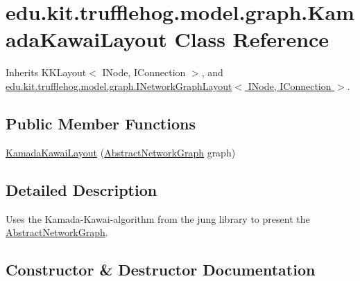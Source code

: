 \hypertarget{classedu_1_1kit_1_1trufflehog_1_1model_1_1graph_1_1_kamada_kawai_layout}{}\section{edu.\+kit.\+trufflehog.\+model.\+graph.\+Kamada\+Kawai\+Layout Class Reference}
\label{classedu_1_1kit_1_1trufflehog_1_1model_1_1graph_1_1_kamada_kawai_layout}


Inherits K\+K\+Layout$<$ I\+Node, I\+Connection $>$, and \hyperlink{interfaceedu_1_1kit_1_1trufflehog_1_1model_1_1graph_1_1_i_network_graph_layout}{edu.\+kit.\+trufflehog.\+model.\+graph.\+I\+Network\+Graph\+Layout$<$ I\+Node, I\+Connection $>$}.

\subsection*{Public Member Functions}
\begin{DoxyCompactItemize}
\item 
\hyperlink{classedu_1_1kit_1_1trufflehog_1_1model_1_1graph_1_1_kamada_kawai_layout_a2acb1f5d7d72b4cbc32257b7bb207762}{Kamada\+Kawai\+Layout} (\hyperlink{classedu_1_1kit_1_1trufflehog_1_1model_1_1graph_1_1_abstract_network_graph}{Abstract\+Network\+Graph} graph)
\end{DoxyCompactItemize}


\subsection{Detailed Description}
Uses the Kamada-\/\+Kawai-\/algorithm from the jung library to present the \hyperlink{classedu_1_1kit_1_1trufflehog_1_1model_1_1graph_1_1_abstract_network_graph}{Abstract\+Network\+Graph}. 

\subsection{Constructor \& Destructor Documentation}
\hypertarget{classedu_1_1kit_1_1trufflehog_1_1model_1_1graph_1_1_kamada_kawai_layout_a2acb1f5d7d72b4cbc32257b7bb207762}{}
